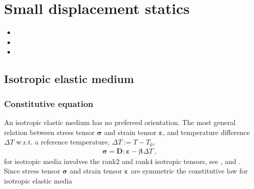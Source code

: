 \documentclass[letterpaper,10pt,english]{jupyterBook}
\begin{document}
\chapter{Small displacement \sphinxhyphen{} statics}
\label{\detokenize{ch/solids/small-displacements-statics:small-displacement-statics}}\label{\detokenize{ch/solids/small-displacements-statics:solid-mechanics-intro-small-displacements-statics}}\label{\detokenize{ch/solids/small-displacements-statics::doc}}\begin{itemize}
\item {} 
\sphinxAtStartPar
{}

\item {} 
\sphinxAtStartPar
{}

\item {} 
\sphinxAtStartPar
{}

\end{itemize}


\section{Isotropic elastic medium}
\label{\detokenize{ch/solids/small-displacements-statics:isotropic-elastic-medium}}\label{\detokenize{ch/solids/small-displacements-statics:solid-mechanics-intro-small-displacements-statics-elastic-medium}}

\subsection{Constitutive equation}
\label{\detokenize{ch/solids/small-displacements-statics:constitutive-equation}}\label{\detokenize{ch/solids/small-displacements-statics:solid-mechanics-intro-small-displacements-statics-elastic-medium-constitutive-equation}}
\sphinxAtStartPar
An isotropic elastic medium has no prefereed orientation. The most general relation between stress tensor \(\symbf{\sigma}\) and strain tensor \(\symbf{\varepsilon}\), and temperature difference \(\Delta T\) w.r.t. a reference temperature, \(\Delta T := T - T_0\),
\begin{equation*}
\begin{split}\symbf{\sigma} = \mathbf{D} : \symbf{\varepsilon} - \symbf{\beta} \Delta T \ ,\end{split}
\end{equation*}
\sphinxAtStartPar
for isotropic media involves the rank\sphinxhyphen{}\(2\) and rank\sphinxhyphen{}\(4\) isotropic tensors, see , and . Since stress tensor \(\symbf{\sigma}\) and strain tensor \(\symbf{\varepsilon}\) are symmetric the constitutive law for isotropic elastic media
\end{document}
